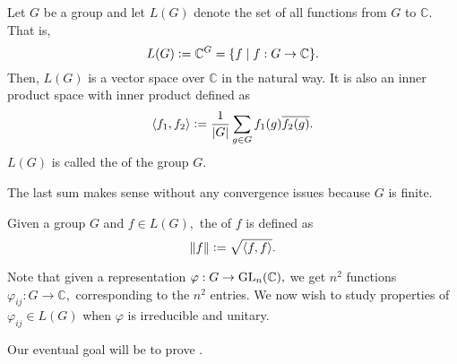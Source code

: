 \begin{defn}%
	\label{defn:groupalg}
	Let $G$ be a group and let $L(G)$ denote the set of all functions from $G$ to $\mathbb{C}.$ That is,
	\begin{equation*} 
		L(G) \vcentcolon= \mathbb{C}^G = \{f \mid f : G \to \mathbb{C}\}.
	\end{equation*}
	Then, $L(G)$ is a vector space over $\mathbb{C}$ in the natural way. It is also an inner product space with inner product defined as
	\begin{equation*} 
		\langle f_1, f_2\rangle \vcentcolon= \dfrac{1}{{\left\lvert G \right\lvert}}\sum_{g \in G} f_1(g) \overline{f_2(g)}.
	\end{equation*}
	$L(G)$ is called the  of the group $G.$
\end{defn}
The last sum makes sense without any convergence issues because $G$ is finite.
\begin{defn}%
	\label{defn:norm} 
	Given a group $G$ and $f \in L(G),$ the  of $f$ is defined as
	\begin{equation*} 
		\|f\| \vcentcolon= \sqrt{\langle f, f\rangle}.
	\end{equation*}
\end{defn}

Note that given a representation $\varphi : G \to \operatorname{GL}_n(\mathbb{C}),$ we get $n^2$ functions $\varphi_{ij} : G \to \mathbb{C},$ corresponding to the $n^2$ entries. We now wish to study properties of $\varphi_{ij} \in L(G)$ when $\varphi$ is irreducible and unitary.

Our eventual goal will be to prove .

